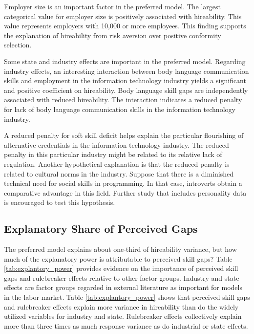 \documentclass[review]{elsarticle}
\begin{document}
Employer size is an important factor in the preferred model.
The largest categorical value for employer size is positively associated with hireability.
This value represents employers with 10,000 or more employees.
This finding supports the explanation of hireability from risk aversion over positive conformity selection.

Some state and industry effects are important in the preferred model.
Regarding industry effects, an interesting interaction between body language communication skills and employment in the information technology industry yields a significant and positive coefficient on hireability.
Body language skill gaps are independently associated with reduced hireability.
The interaction indicates a reduced penalty for lack of body language communication skills
in the information technology industry.

A reduced penalty for soft skill deficit helps explain the particular flourishing of alternative credentials in the information technology industry.
The reduced penalty in this particular industry might be related to its relative lack of regulation.
Another hypothetical explanation is that the reduced penalty is related to cultural norms in the industry.
Suppose that there is a diminished technical need for social skills in programming.
In that case, introverts obtain a comparative advantage in this field.
Further study that includes personality data is encouraged to test this hypothesis.

\subsection{Explanatory Share of Perceived Gaps}

The preferred model explains about one-third of hireability variance, but how much of the explanatory power is attributable to perceived skill gaps?
Table \ref{tab:explantory_power} provides evidence on the importance of perceived skill gaps and rulebreaker effects relative to other factor groups.
Industry and state effects are factor groups regarded in external literature as important for models in the labor market.
Table \ref{tab:explantory_power} shows that perceived skill gaps and rulebreaker effects explain more variance in hireability than do the widely utilized variables for industry and state.
Rulebreaker effects collectively explain more than three times as much response variance as do industrial or state effects.
\end{document}
